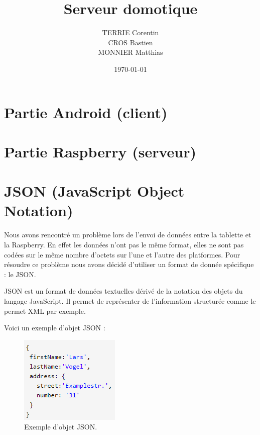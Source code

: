 \documentclass[a4paper,10pt]{article}
\title{Serveur domotique}
\author{TERRIE Corentin \\ CROS Bastien \\ MONNIER Matthias}
\date{\today}
\begin{document}

\tableofcontents
\clearpage



\section{Partie Android (client)}




\section{Partie Raspberry (serveur)}




\section{JSON (JavaScript Object Notation)}

Nous avons rencontré un problème lors de l'envoi de données entre la tablette et la Raspberry. En effet les données n'ont pas le même format, elles ne sont pas codées sur le même nombre d'octets sur l'une et l'autre des platformes. Pour résoudre ce problème nous avons décidé d'utiliser un format de donnée spécifique : le JSON.

JSON est un format de données textuelles dérivé de la notation des objets du langage JavaScript. Il permet de représenter de l’information structurée comme le permet XML par exemple. 

Voici un exemple d'objet JSON :
\begin{figure}[H]
\centering\includegraphics[scale=0.7]{images/json_exemple.png}
\caption{Exemple d'objet JSON.}
\end{figure}
\end{document}
